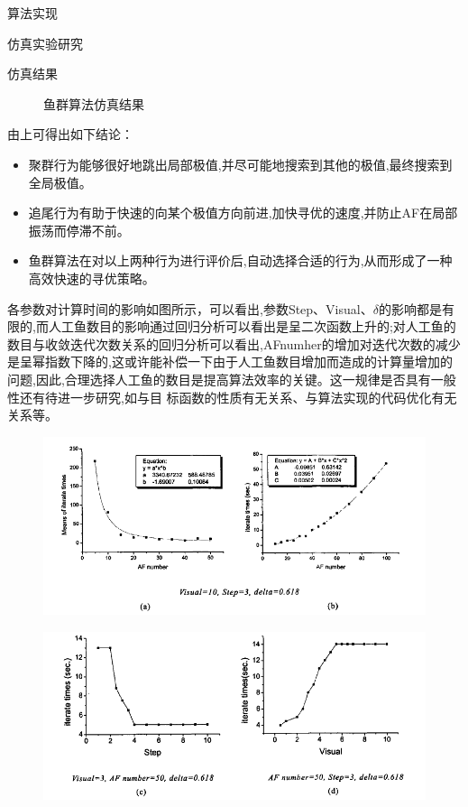 \documentclass[UTF8]{ctexart}
\begin{document}
\begin{section}{算法实现}
\begin{subsection}{仿真实验研究}
\begin{subsubsection}{仿真结果}
\begin{figure}[H]
\caption{鱼群算法仿真结果}
\end{figure}
由上可得出如下结论：
\begin{itemize}
\item{聚群行为能够很好地跳出局部极值,并尽可能地搜索到其他的极值,最终搜索到全局极值。}
\item{追尾行为有助于快速的向某个极值方向前进,加快寻优的速度,并防止AF在局部振荡而停滞不前。}
\item{鱼群算法在对以上两种行为进行评价后,自动选择合适的行为,从而形成了一种高效快速的寻优策略。}
\end{itemize}

\end{subsubsection}
\begin{subsubsection}{各参数对计算时间的影响}如图所示，可以看出,参数Step、Visual、$\delta$的影响都是有限的,而人工鱼数目的影响通过回归分析可以看出是呈二次函数上升的;对人工鱼的数目与收敛迭代次数关系的回归分析可以看出,AFnumher的增加对迭代次数的减少是呈幂指数下降的,这或许能补偿一下由于人工鱼数目增加而造成的计算量增加的问题,因此,合理选择人工鱼的数目是提高算法效率的关键。这一规律是否具有一般性还有待进一步研究,如与目
标函数的性质有无关系、与算法实现的代码优化有无关系等。
\begin{figure}[H]\centering
\includegraphics[width=1.0\textwidth]{../../pic/fish6.png}
\end{figure}
\begin{figure}[H]\centering
\includegraphics[width=1.0\textwidth]{../../pic/fish7.png}

\end{figure}
\end{subsubsection}
\end{subsection}
\end{section}
\end{document}
